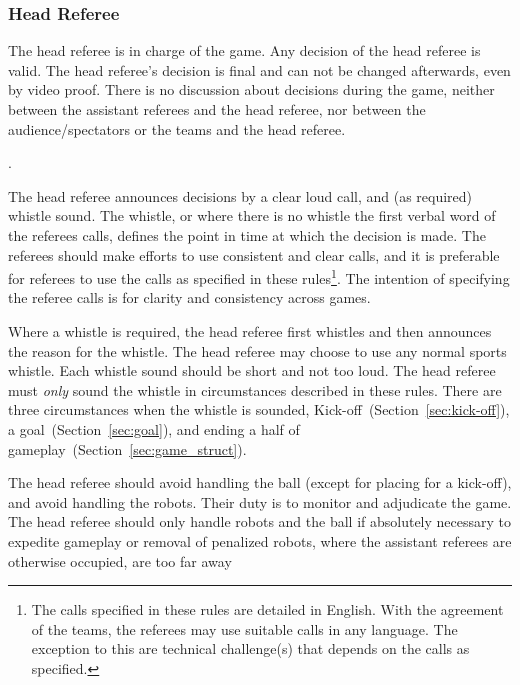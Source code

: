

\subsubsection{Head Referee}
\label{sec:head_referee}

The head referee is in charge of the game. Any decision of the head referee is valid. The head referee's decision is final and can not be changed afterwards, even by video proof. There is no discussion about decisions during the game, neither between the assistant referees and the head referee, nor between the audience/spectators or the teams and the head referee.

.

The head referee announces decisions by a clear loud call, and (as required) whistle sound.
The whistle, or where there is no whistle the first verbal word of the referees calls, defines the point in time at which the decision is made.
The referees should make efforts to use consistent and clear calls, and it is preferable for referees to use the calls as specified in these rules\footnote{The calls specified in these rules are detailed in English. With the agreement of the teams, the referees may use suitable calls in any language. The exception to this are technical challenge(s) that depends on the calls as specified.}.
The intention of specifying the referee calls is for clarity and consistency across games.

Where a whistle is required, the head referee first whistles and then announces the reason for the whistle.
The head referee may choose to use any normal sports whistle.
Each whistle sound should be short and not too loud.
The head referee must \textit{only} sound the whistle in circumstances described in these rules.
There are three circumstances when the whistle is sounded, Kick-off~(\cf Section~\ref{sec:kick-off}), a goal~(\cf Section~\ref{sec:goal}), and ending a half of gameplay~(\cf Section~\ref{sec:game_struct}).

The head referee should avoid handling the ball (except for placing  for a kick-off), and avoid handling the robots.
Their duty is to monitor and adjudicate the game.
The head referee should only handle robots and the ball if absolutely necessary to expedite gameplay or removal of penalized robots, where the assistant referees are otherwise occupied, are too far away 

